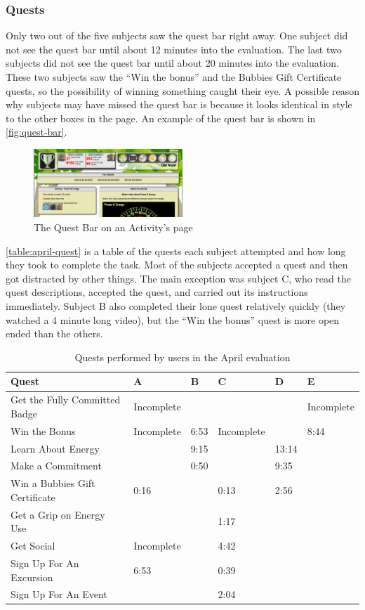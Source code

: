 \subsubsection{Quests}

Only two out of the five subjects saw the quest bar right away. One subject did not see the quest bar until about 12 minutes into the evaluation. The last two subjects did not see the quest bar until about 20 minutes into the evaluation. These two subjects saw the ``Win the  bonus'' and the Bubbies Gift Certificate quests, so the possibility of winning something caught their eye. A possible reason why subjects may have missed the quest bar is because it looks identical in style to the other boxes in the page. An example of the quest bar is shown in \autoref{fig:quest-bar}.

\begin{figure}[t]
    \center
    \includegraphics[width=0.5\textwidth]{images/quest-bar.eps}
    \caption{The Quest Bar on an Activity's page}
    \label{fig:quest-bar}
\end{figure}

\autoref{table:april-quest} is a table of the quests each subject attempted and how long they took to complete the task. Most of the subjects accepted a quest and then got distracted by other things. The main exception was subject C, who read the quest descriptions, accepted the quest, and carried out its instructions immediately. Subject B also completed their lone quest relatively quickly (they watched a 4 minute long video), but the ``Win the  bonus'' quest is more open ended than the others.

\begin{table}[t]
	\begin{tabular}{| l || l | l | l | l | l |}
		\hline
		Quest & A & B & C & D & E \\
		\hline
		Get the Fully Committed Badge & Incomplete & & & & Incomplete \\
		Win the \textdollar10 Bonus & Incomplete & 6:53 & Incomplete & & 8:44 \\
		Learn About Energy & & 9:15 & & 13:14 &\\
		Make a Commitment & & 0:50 & & 9:35 & \\
		Win a Bubbies Gift Certificate & 0:16 & & 0:13 & 2:56 & \\
		Get a Grip on Energy Use & & & 1:17 & & \\
		Get Social & Incomplete & & 4:42 & & \\
		Sign Up For An Excursion & 6:53 & & 0:39 & & \\
		Sign Up For An Event & & & 2:04 & & \\
		\hline
	\end{tabular}
	\caption{Quests performed by users in the April evaluation}
	\label{table:april-quest}
\end{table}

